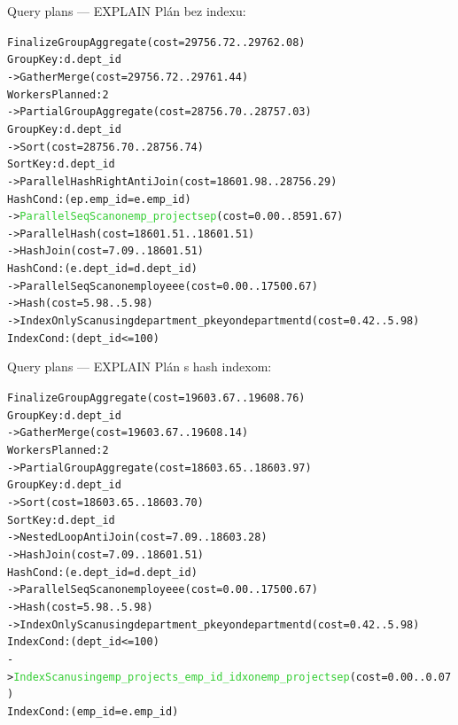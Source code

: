 \documentclass[12pt]{beamer}
\def\blue#1{\textcolor{Cerulean}{#1}}
\def\green#1{\textcolor{LimeGreen}{#1}}
\begin{document}
\begin{frame}[fragile]{Query plans --- EXPLAIN}
Plán bez indexu:
\tiny
\begin{alltt}
Finalize GroupAggregate  (cost=\alert{29756.72..29762.08})
  Group Key: d.dept_id
  ->  Gather Merge  (cost=29756.72..29761.44)
    Workers Planned: 2
    ->  Partial GroupAggregate  (cost=28756.70..28757.03)
      Group Key: d.dept_id
      ->  Sort  (cost=28756.70..28756.74)
        Sort Key: d.dept_id
        ->  \alert{Parallel Hash Right Anti Join}  (cost=18601.98..28756.29)
          Hash Cond: (ep.emp_id = e.emp_id)
          ->  \green{Parallel Seq Scan on emp_projects ep}  (cost=0.00..8591.67)
          ->  \blue{Parallel Hash}  (cost=18601.51..18601.51)
            ->  \blue{Hash Join}  (cost=7.09..18601.51)
              Hash Cond: (e.dept_id = d.dept_id)
              ->  Parallel Seq Scan on employee e  (cost=0.00..17500.67)
              ->  Hash  (cost=5.98..5.98)
                ->  Index Only Scan using department_pkey on department d  (cost=0.42..5.98)
                  Index Cond: (dept_id <= 100)
                  \end{alltt}
\end{frame}

\begin{frame}[fragile]{Query plans --- EXPLAIN}
Plán s hash indexom:
\tiny
\begin{alltt}
Finalize GroupAggregate  (cost=\alert{19603.67..19608.76})
  Group Key: d.dept_id
  ->  Gather Merge  (cost=19603.67..19608.14)
    Workers Planned: 2
    ->  Partial GroupAggregate  (cost=18603.65..18603.97)
      Group Key: d.dept_id
      ->  Sort  (cost=18603.65..18603.70)
        Sort Key: d.dept_id
        ->  \alert{Nested Loop Anti Join}  (cost=7.09..18603.28)
          ->  \blue{Hash Join}  (cost=7.09..18601.51)
            Hash Cond: (e.dept_id = d.dept_id)
            ->  Parallel Seq Scan on employee e  (cost=0.00..17500.67)
            ->  Hash  (cost=5.98..5.98)
              ->  Index Only Scan using department_pkey on department d  (cost=0.42..5.98)
                Index Cond: (dept_id <= 100)
          ->  \green{Index Scan using emp_projects_emp_id_idx on emp_projects ep}  (cost=0.00..0.07)
            Index Cond: (emp_id = e.emp_id)
            \end{alltt}
\end{frame}
\end{document}
